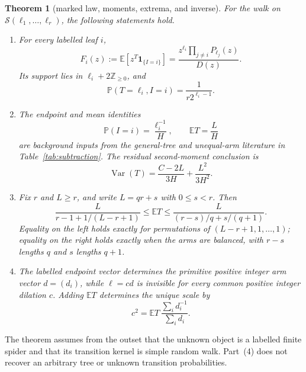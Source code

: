 \documentclass[a4paper,10pt]{amsart}
\newtheorem{theorem}{Theorem}
\theoremstyle{remark}
\newcommand{\Prob}{\mathbb P}
\newcommand{\E}{\mathbb E}
\newcommand{\one}{\mathbf 1}
\newcommand{\cS}{\mathcal S}
\begin{document}
\begin{theorem}[marked law, moments, extrema, and inverse]\label{thm:main}
For the walk on $\cS(\ell_1,\ldots,\ell_r)$, the following statements hold.
\begin{enumerate}
\item For every labelled leaf $i$,
\begin{equation}\label{eq:marked}
 F_i(z):=\E\!\left[z^T\one_{\{I=i\}}\right]
 =\frac{z^{\ell_i}\prod_{j\ne i}P_{\ell_j}(z)}{D(z)}.
\end{equation}
Its support lies in $\ell_i+2\mathbb Z_{\ge0}$, and
\begin{equation}\label{eq:first-atom}
 \Prob(T=\ell_i,I=i)=\frac1{r2^{\ell_i-1}}.
\end{equation}
\item The endpoint and mean identities
\begin{equation}\label{eq:background-moments}
 \Prob(I=i)=\frac{\ell_i^{-1}}H,\qquad \E T=\frac LH
\end{equation}
are background inputs from the general-tree and unequal-arm literature in
Table~\ref{tab:subtraction}.  The residual second-moment conclusion is
\begin{equation}\label{eq:variance}
 \operatorname{Var}(T)=\frac{C-2L}{3H}+\frac{L^2}{3H^2}.
\end{equation}
\item Fix $r$ and $L\ge r$, and write $L=qr+s$ with $0\le s<r$.  Then
\begin{equation}\label{eq:extremal}
 \frac{L}{r-1+1/(L-r+1)}\le \E T
 \le \frac{L}{(r-s)/q+s/(q+1)}.
\end{equation}
Equality on the left holds exactly for permutations of
$(L-r+1,1,\ldots,1)$; equality on the right holds exactly when the arms are
balanced, with $r-s$ lengths $q$ and $s$ lengths $q+1$.
\item The labelled endpoint vector determines the primitive positive integer
arm vector $d=(d_i)$, while $\ell=cd$ is invisible for every common positive
integer dilation $c$.  Adding $\E T$ determines the unique scale by
\begin{equation}\label{eq:scale}
 c^2=\E T\,\frac{\sum_i d_i^{-1}}{\sum_i d_i}.
\end{equation}
\end{enumerate}
\end{theorem}

The theorem assumes from the outset that the unknown object is a labelled
finite spider and that its transition kernel is simple random walk.  Part~(4)
does not recover an arbitrary tree or unknown transition probabilities.
\end{document}
